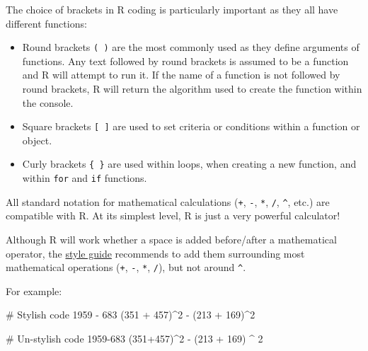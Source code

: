 \documentclass[
  letterpaper,
  DIV=11,
  numbers=noendperiod]{scrreprt}
\newenvironment{Shaded}{\begin{snugshade}}{\end{snugshade}}
\newcommand{\CommentTok}[1]{\textcolor[rgb]{0.37,0.37,0.37}{#1}}
\newcommand{\DecValTok}[1]{\textcolor[rgb]{0.68,0.00,0.00}{#1}}
\newcommand{\NormalTok}[1]{\textcolor[rgb]{0.00,0.23,0.31}{#1}}
\newcommand{\SpecialCharTok}[1]{\textcolor[rgb]{0.37,0.37,0.37}{#1}}
\providecommand{\tightlist}{%
  \setlength{\itemsep}{0pt}\setlength{\parskip}{0pt}}\usepackage{longtable,booktabs,array}
\begin{document}
The choice of brackets in R coding is particularly important as they all
have different functions:

\begin{itemize}
\tightlist
\item
  Round brackets \texttt{(\ )} are the most commonly used as they define
  arguments of functions. Any text followed by round brackets is assumed
  to be a function and R will attempt to run it. If the name of a
  function is not followed by round brackets, R will return the
  algorithm used to create the function within the console.
\item
  Square brackets \texttt{{[}\ {]}} are used to set criteria or
  conditions within a function or object.
\item
  Curly brackets \texttt{\{\ \}} are used within loops, when creating a
  new function, and within \texttt{for} and \texttt{if} functions.
\end{itemize}

All standard notation for mathematical calculations (\texttt{+},
\texttt{-}, \texttt{*}, \texttt{/}, \texttt{\^{}}, etc.) are compatible
with R. At its simplest level, R is just a very powerful calculator!

\begin{tcolorbox}[enhanced jigsaw, bottomrule=.15mm, left=2mm, leftrule=.75mm, bottomtitle=1mm, coltitle=black, colbacktitle=quarto-callout-tip-color!10!white, toptitle=1mm, arc=.35mm, breakable, title=\textcolor{quarto-callout-tip-color}{\faLightbulb}\hspace{0.5em}{Style tip}, rightrule=.15mm, toprule=.15mm, opacityback=0, opacitybacktitle=0.6, titlerule=0mm, colback=white, colframe=quarto-callout-tip-color-frame]

Although R will work whether a space is added before/after a
mathematical operator, the
\href{https://style.tidyverse.org/syntax.html}{style guide} recommends
to add them surrounding most mathematical operations (\texttt{+},
\texttt{-}, \texttt{*}, \texttt{/}), but not around \texttt{\^{}}.

For example:

\begin{Shaded}
\begin{Highlighting}[]
\CommentTok{\# Stylish code}
\DecValTok{1959} \SpecialCharTok{{-}} \DecValTok{683}
\NormalTok{(}\DecValTok{351} \SpecialCharTok{+} \DecValTok{457}\NormalTok{)}\SpecialCharTok{\^{}}\DecValTok{2} \SpecialCharTok{{-}}\NormalTok{ (}\DecValTok{213} \SpecialCharTok{+} \DecValTok{169}\NormalTok{)}\SpecialCharTok{\^{}}\DecValTok{2}

\CommentTok{\# Un{-}stylish code}
\DecValTok{1959{-}683}
\NormalTok{(}\DecValTok{351}\SpecialCharTok{+}\DecValTok{457}\NormalTok{)}\SpecialCharTok{\^{}}\DecValTok{2} \SpecialCharTok{{-}}\NormalTok{ (}\DecValTok{213} \SpecialCharTok{+} \DecValTok{169}\NormalTok{) }\SpecialCharTok{\^{}} \DecValTok{2}
\end{Highlighting}
\end{Shaded}

\end{tcolorbox}
\end{document}
